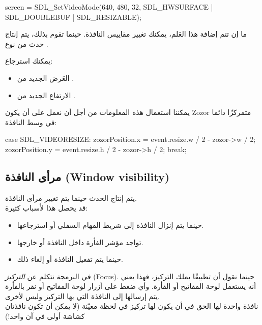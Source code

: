 \begin{Csource}
screen = SDL_SetVideoMode(640, 480, 32, SDL_HWSURFACE | SDL_DOUBLEBUF | SDL_RESIZABLE);
\end{Csource}

ما إن تتم إضافة هذا العَلم، يمكنك تغيير مقاييس النافذة. حينما تقوم بذلك، يتم إنتاج  حدث من نوع
.

يمكنك استرجاع:

\begin{itemize}
	\item العَرض الجديد من
	.
	\item الارتفاع الجديد من
	.
\end{itemize}

يمكننا استعمال هذه المعلومات من أجل أن نعمل على أن يكون
\textenglish{Zozor}
متمركزًا دائما في وسط النافذة:

\begin{Csource}
case SDL_VIDEORESIZE:
zozorPosition.x = event.resize.w / 2 - zozor->w / 2;
zozorPosition.y = event.resize.h / 2 - zozor->h / 2;
break;
\end{Csource}

\subsection{مرأى النافذة (\textenglish{Window visibility})}

يتم إنتاج الحدث
حينما يتم تغيير مرأى النافذة.\\
قد يحصل هذا لأسباب كثيرة:

\begin{itemize}
	\item حينما يتم إنزال النافذة إلى شريط المهام السفلي أو استرجاعها.
	\item تواجد مؤشر الفأرة داخل النافذة أو خارجها.
	\item حينما يتم تفعيل النافذة أو إلغاء ذلك.
\end{itemize}

\begin{information}
في البرمجة نتكلم عن
\textit{التركيز}
(\textenglish{Focus}).
حينما نقول أن تطبيقًا يملك التركيز، فهذا يعني أنه يستعمل لوحة المفاتيح أو الفأرة. وأي ضغط على أزرار لوحة المفاتيح أو نقر بالفأرة يتم إرسالها إلى النافذة التي بها التركيز وليس لأخرى.\\
نافذة واحدة لها الحق في أن يكون لها تركيز في لحظة معيّنة (لا يمكن أن تكون نافذتان كشاشة أولى في آن واحد!)
\end{information}


